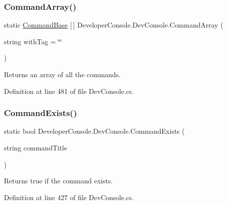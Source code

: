 \subsubsection{\texorpdfstring{Command\+Array()}{CommandArray()}}
{\footnotesize\ttfamily static \hyperlink{class_developer_console_1_1_core_1_1_command_base}{Command\+Base} \mbox{[}$\,$\mbox{]} Developer\+Console.\+Dev\+Console.\+Command\+Array (\begin{DoxyParamCaption}\item[{string}]{with\+Tag = {\ttfamily \char`\"{}\char`\"{}} }\end{DoxyParamCaption})\hspace{0.3cm}{\ttfamily [static]}}



Returns an array of all the commands. 



Definition at line 481 of file Dev\+Console.\+cs.

\mbox{\label{class_developer_console_1_1_dev_console_a369547e22d3fcc7d2d6b90b7c6300a30}} 
\subsubsection{\texorpdfstring{Command\+Exists()}{CommandExists()}}
{\footnotesize\ttfamily static bool Developer\+Console.\+Dev\+Console.\+Command\+Exists (\begin{DoxyParamCaption}\item[{string}]{command\+Title }\end{DoxyParamCaption})\hspace{0.3cm}{\ttfamily [static]}}



Returns true if the command exists. 



Definition at line 427 of file Dev\+Console.\+cs.

\mbox{\label{class_developer_console_1_1_dev_console_ab2a1e0c75f816fabb91576e1dd3c9017}} 

